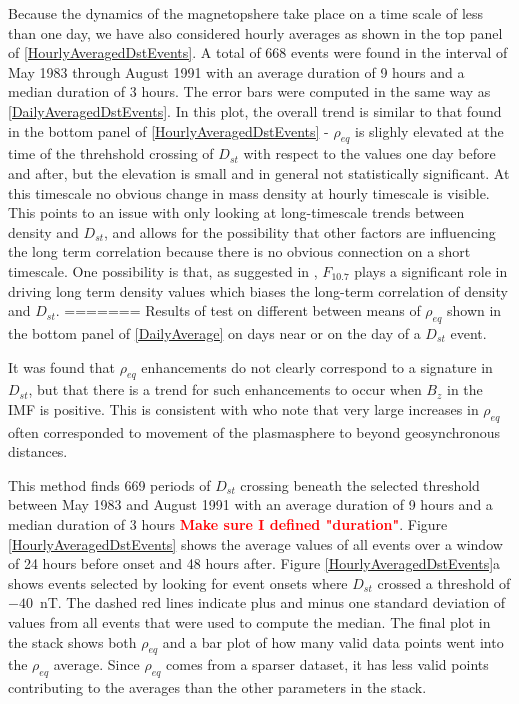 \documentclass[10pt,twocolumn]{article}
\newcommand{\vinote}[1]{\textcolor{red}{\textbf{#1}}} %
\newcommand{\inote}[1]{\textcolor{blue}{\textbf{#1}}} %
\def\note#1\par{\textcolor{blue}{\textbf{#1}}\\}
\begin{document}
Because the dynamics of the magnetopshere take place on a time scale of less than one day, we have also considered hourly averages as shown in the top panel of \ref{HourlyAveragedDstEvents}.  A total of 668 events were found in the interval of May 1983 through August 1991 with an average duration of 9 hours and a median duration of 3 hours.  The error bars were computed in the same way as \ref{DailyAveragedDstEvents}.  In this plot, the overall trend is similar to that found in the bottom panel of \ref{HourlyAveragedDstEvents} - $\rho_{eq}$ is slighly elevated at the time of the threhshold crossing of $D_{st}$ with respect to the values one day before and after, but the elevation is small and in general not statistically significant.  At this timescale no obvious change in mass density at hourly timescale is visible. This points to an issue with only looking at long-timescale trends between density and $D_{st}$, and allows for the possibility that other factors are influencing the long term correlation because there is no obvious connection on a short timescale.  One possibility is that, as suggested in \cite{Takahashi2010}, $F_{10.7}$ plays a significant role in driving long term density values which biases the long-term correlation of density and $D_{st}$.
=======
Results of test on different between means of $\rho_{eq}$ shown in the bottom panel of \ref{DailyAverage} on days near or on the day of a $D_{st}$ event.  

It was found that $\rho_{eq}$ enhancements do not clearly correspond to a signature in $D_{st}$, but that there is a trend for such enhancements to occur when $B_{z}$ in the IMF is positive.  This is consistent with \cite{Takahashi2010} who note that very large increases in $\rho_{eq}$ often corresponded to movement of the plasmasphere to beyond geosynchronous distances. 

This method finds 669 periods of $D_{st}$ crossing beneath the selected threshold between May 1983 and August 1991 with an average duration of 9 hours and a median duration of 3 hours \vinote{Make sure I defined "duration"}. Figure \ref{HourlyAveragedDstEvents} shows the average values of all events over a window of 24 hours before onset and 48 hours after. Figure \ref{HourlyAveragedDstEvents}a shows events selected by looking for event onsets where $D_{st}$ crossed a threshold of $-40$~nT. The dashed red lines indicate plus and minus one standard deviation of values from all events that were used to compute the median. The final plot in the stack shows both $\rho_{eq}$ and a bar plot of how many valid data points went into the $\rho_{eq}$ average. Since $\rho_{eq}$ comes from a sparser dataset, it has less valid points contributing to the averages than the other parameters in the stack. 
\end{document}
